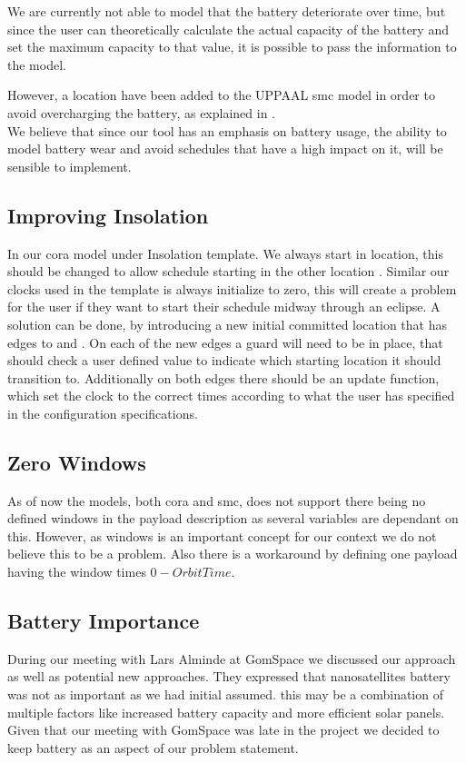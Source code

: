 We are currently not able to model that the battery deteriorate over time, but since the user can theoretically calculate the actual capacity of the battery and set the maximum capacity to that value, it is possible to pass the information to the model.

However, a location have been added to the UPPAAL \gls{smc} model in order to avoid overcharging the battery, as explained in .\\

We believe that since our tool has an emphasis on battery usage, the ability to model battery wear and avoid schedules that have a high impact on it, will be sensible to implement. 

\subsection*{Improving Insolation}
In our \gls{cora} model under Insolation template. We always start in  location, this should be changed to allow schedule starting in the other location . Similar our clocks used in the template is always initialize to zero, this will create a problem for the user if they want to start their schedule midway through an eclipse. A solution can be done, by introducing a new initial committed location that has edges to  and . On each of the new edges a guard will need to be in place, that should check a user defined value to indicate which starting location it should transition to. Additionally on both edges there should be an update function, which set the clock to the correct times according to what the user has specified in the configuration specifications.

\subsection*{Zero Windows}
As of now the models, both \gls{cora} and \gls{smc}, does not support there being no defined windows in the payload description as several variables are dependant on this. However, as windows is an important concept for our context we do not believe this to be a problem. Also there is a workaround by defining one payload having the window times $0-OrbitTime$.

\subsection*{Battery Importance}
During our meeting with Lars Alminde at GomSpace we discussed our approach as well as potential new approaches. They expressed that nanosatellites battery was not as important as we had initial assumed\cite{gom_space_conversation}. this may be a combination of multiple factors like increased battery capacity and more efficient solar panels. Given that our meeting with GomSpace was late in the project we decided to keep battery as an aspect of our problem statement.



